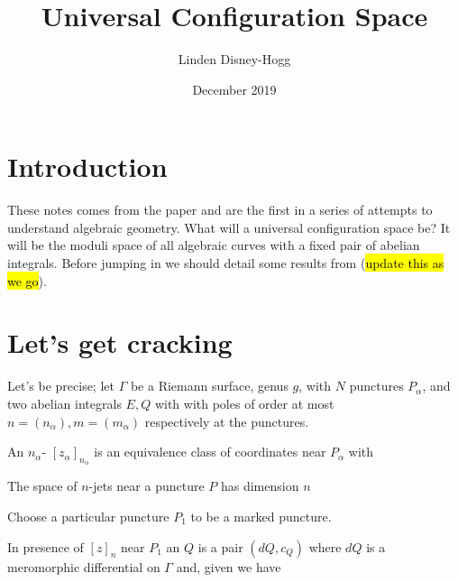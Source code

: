 \documentclass{article}
\title{Universal Configuration Space}
\author{Linden Disney-Hogg}
\date{December 2019}
\begin{document}
\maketitle
\tableofcontents

\section{Introduction}
These notes comes from the paper \cite{Krichever1996} and are the first in a series of attempts to understand algebraic geometry. What will a universal configuration space be? It will be the moduli space of all algebraic curves with a fixed pair of abelian integrals. Before jumping in we should detail some results from \cite{Miranda1995} (\hl{update this as we go}). 

\section{Let's get cracking}
Let's be precise; let $\Gamma$ be a Riemann surface, genus $g$, with $N$ punctures $P_\alpha$, and two abelian integrals $E,Q$ with with poles of order at most $n=(n_\alpha), m=(m_\alpha)$ respectively at the punctures. 

\begin{definition}
An $n_\alpha$- $[z_\alpha]_{n_\alpha}$ is an equivalence class of coordinates near $P_\alpha$ with 
\end{definition}

\begin{fact}
The space of $n$-jets near a puncture $P$ has dimension $n$
\end{fact}

Choose a particular puncture $P_1$ to be a marked puncture. 

\begin{definition}
In presence of $[z]_n$ near $P_1$ an  $Q$ is a pair $(dQ,c_Q)$ where $dQ$ is a meromorphic differential on $\Gamma$ and, given 
we have 
\end{definition}
\end{document}
